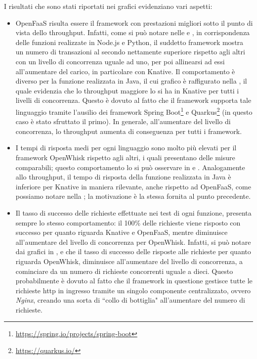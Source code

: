 \documentclass[12pt,a4paper,openany,twoside]{book}
\begin{document}
I risultati che sono stati riportati nei grafici evidenziano vari aspetti:
\begin{itemize}
    \item OpenFaaS risulta essere il framework con prestazioni migliori sotto il punto di vista dello throughput. Infatti, come si può notare nelle   e , in corrispondenza delle funzioni realizzate in Node.js e Python, il suddetto framework mostra un numero di transazioni al secondo nettamente superiore rispetto agli altri con un livello di concorrenza uguale ad uno, per poi allinearsi ad essi all'aumentare del carico, in particolare con Knative. Il comportamento è diverso per la funzione realizzata in Java, il cui grafico è raffigurato nella , il quale evidenzia che lo throughput maggiore lo si ha in Knative per tutti i livelli di concorrenza. Questo è dovuto al fatto che il framework supporta tale linguaggio tramite l'ausilio dei framework Spring Boot\footnote{\url{https://spring.io/projects/spring-boot}} e Quarkus\footnote{\url{https://quarkus.io/}} (in questo caso è stato sfruttato il primo). In generale, all'aumentare del livello di concorrenza, lo throughput aumenta di conseguenza per tutti i framework.
    
    \item I tempi di risposta medi per ogni linguaggio sono molto più elevati per il framework OpenWhisk rispetto agli altri, i quali presentano delle misure comparabili; questo comportamento lo si può osservare in  e . Analogamente allo throughput, il tempo di risposta della funzione realizzata in Java è inferiore per Knative in maniera rilevante, anche rispetto ad OpenFaaS, come possiamo notare nella ; la motivazione è la stessa fornita al punto precedente.
    
    \item Il tasso di successo delle richieste effettuate nei test di ogni funzione, presenta sempre lo stesso comportamento: il 100\% delle richieste viene risposto con successo per quanto riguarda Knative e OpenFaaS, mentre diminuisce all'aumentare del livello di concorrenza per OpenWhisk. Infatti, si può notare dai grafici in ,  e  che il tasso di successo delle risposte alle richieste per quanto riguarda OpenWhisk, diminuisce all'aumentare del livello di concorrenza, a cominciare da un numero di richieste concorrenti uguale a dieci. Questo probabilmente è dovuto al fatto che il framework in questione gestisce tutte le richieste \ac{http} in ingresso tramite un singolo componente centralizzato, ovvero \textit{Nginx}, creando una sorta di ``collo di bottiglia" all'aumentare del numero di richieste.
\end{itemize}
\end{document}
